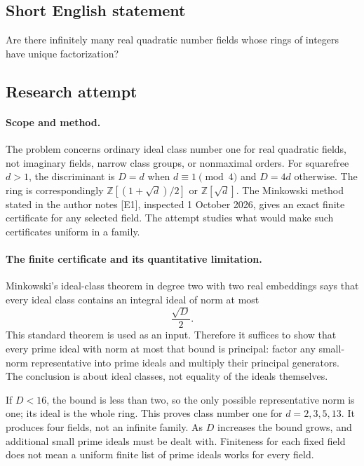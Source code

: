 \documentclass[11pt,a4paper]{article}
\begin{document}
\subsection{Short English statement}

Are there infinitely many real quadratic number fields whose rings of integers have unique factorization?

\subsection{Research attempt}

\paragraph{Scope and method.}
The problem concerns ordinary ideal class number one for real quadratic
fields, not imaginary fields, narrow class groups, or nonmaximal orders.
For squarefree $d>1$, the discriminant is $D=d$ when $d\equiv1\pmod4$
and $D=4d$ otherwise. The ring is correspondingly
$\mathbb Z[(1+\sqrt d)/2]$ or $\mathbb Z[\sqrt d]$.
The Minkowski method stated in the author notes [E1], inspected
1 October 2026, gives an exact finite certificate for any selected field.
The attempt studies what would make such certificates uniform in a family.

\paragraph{The finite certificate and its quantitative limitation.}
Minkowski's ideal-class theorem in degree two with two real embeddings
says that every ideal class contains an integral ideal of norm at most
\[
                              \frac{\sqrt D}{2}.
\]
This standard theorem is used as an input. Therefore it suffices to
show that every prime ideal with norm at most that bound is principal:
factor any small-norm representative into prime ideals and multiply
their principal generators. The conclusion is about ideal classes,
not equality of the ideals themselves.

If $D<16$, the bound is less than two, so the only possible representative
norm is one; its ideal is the whole ring. This proves class number one
for $d=2,3,5,13$. It produces four fields, not an infinite family.
As $D$ increases the bound grows, and additional small prime ideals
must be dealt with. Finiteness for each fixed field does not mean a
uniform finite list of prime ideals works for every field.
\end{document}

